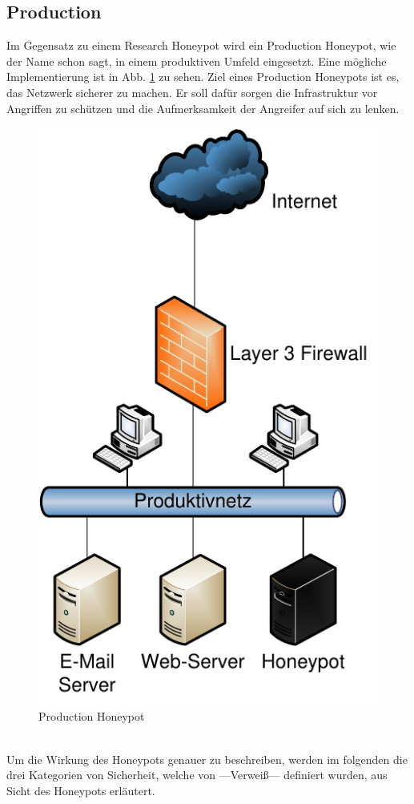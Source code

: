 \subsection{Production}

Im Gegensatz zu einem Research Honeypot wird ein Production Honeypot, wie der Name schon sagt, in einem produktiven Umfeld eingesetzt. Eine mögliche Implementierung ist in Abb. \ref{hnet:prodhon} zu sehen. Ziel eines Production Honeypots ist es, das Netzwerk sicherer zu machen. Er soll dafür sorgen die Infrastruktur vor Angriffen zu schützen und die Aufmerksamkeit der Angreifer auf sich zu lenken. 
\\
\begin{figure}[ht]
    \centering\includegraphics[scale=0.6]{Bilder/produktiv.pdf}
  \caption{Production Honeypot}
  \label{hnet:prodhon}
\end{figure}
\\
Um die Wirkung des Honeypots genauer zu beschreiben, werden im folgenden die drei Kategorien von \glqq Sicherheit\grqq, welche von ---Verweiß--- definiert wurden, aus Sicht des Honeypots erläutert.


